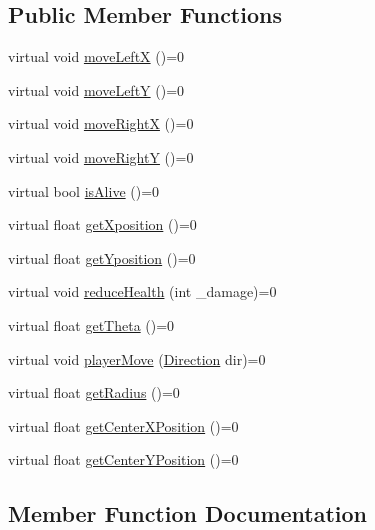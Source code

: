 \subsection*{Public Member Functions}
\begin{DoxyCompactItemize}
\item 
virtual void \hyperlink{class_i_player_a46d098eef1da625e555852341ced76c9}{move\+LeftX} ()=0
\item 
virtual void \hyperlink{class_i_player_ab4a195d99869ef7628e923e433fc8264}{move\+LeftY} ()=0
\item 
virtual void \hyperlink{class_i_player_a59f3be9939ee5406cb215845b6cf00c4}{move\+RightX} ()=0
\item 
virtual void \hyperlink{class_i_player_ae0c49a2900ebbfa951f24bc1bf4bb382}{move\+RightY} ()=0
\item 
virtual bool \hyperlink{class_i_player_a5b417cd92b4463e1c296a627430282b6}{is\+Alive} ()=0
\item 
virtual float \hyperlink{class_i_player_a9df96a1fd43f35f2579e2ec4a167acfe}{get\+Xposition} ()=0
\item 
virtual float \hyperlink{class_i_player_af72407abf2418dd9c1df50f29d51f0ef}{get\+Yposition} ()=0
\item 
virtual void \hyperlink{class_i_player_a27eab471444f8ae2cf96bee562488b70}{reduce\+Health} (int \+\_\+damage)=0
\item 
virtual float \hyperlink{class_i_player_a05103e6bebfd4230bab62d112c7e4eec}{get\+Theta} ()=0
\item 
virtual void \hyperlink{class_i_player_a39685438043898f69bcf62c81b60e7b9}{player\+Move} (\hyperlink{_game_common_data_8h_a224b9163917ac32fc95a60d8c1eec3aa}{Direction} dir)=0
\item 
virtual float \hyperlink{class_i_player_a240460b3baeee74029f1fc407493d121}{get\+Radius} ()=0
\item 
virtual float \hyperlink{class_i_player_a10d652f5066f96f3526242448de3a6e2}{get\+Center\+X\+Position} ()=0
\item 
virtual float \hyperlink{class_i_player_a6c5a2ec396245f91bee3e00ab089d57e}{get\+Center\+Y\+Position} ()=0
\end{DoxyCompactItemize}


\subsection{Member Function Documentation}
\mbox{\label{class_i_player_a10d652f5066f96f3526242448de3a6e2}} 
